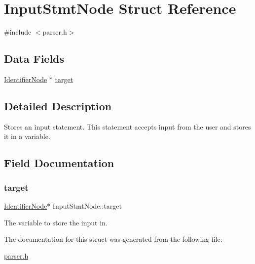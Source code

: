 \hypertarget{struct_input_stmt_node}{}\section{Input\+Stmt\+Node Struct Reference}
\label{struct_input_stmt_node}


{\ttfamily \#include $<$parser.\+h$>$}

\subsection*{Data Fields}
\begin{DoxyCompactItemize}
\item 
\hyperlink{parser_8h_a930727769b8a8eb0d24d474f3aa12a43}{Identifier\+Node} $\ast$ \hyperlink{struct_input_stmt_node_ad7cb247683faf94a9da01d08055349f2}{target}
\end{DoxyCompactItemize}


\subsection{Detailed Description}
Stores an input statement. This statement accepts input from the user and stores it in a variable. 

\subsection{Field Documentation}
\mbox{\label{struct_input_stmt_node_ad7cb247683faf94a9da01d08055349f2}} 
\subsubsection{\texorpdfstring{target}{target}}
{\footnotesize\ttfamily \hyperlink{parser_8h_a930727769b8a8eb0d24d474f3aa12a43}{Identifier\+Node}$\ast$ Input\+Stmt\+Node\+::target}

The variable to store the input in. 

The documentation for this struct was generated from the following file\+:\begin{DoxyCompactItemize}
\item 
\hyperlink{parser_8h}{parser.\+h}\end{DoxyCompactItemize}
